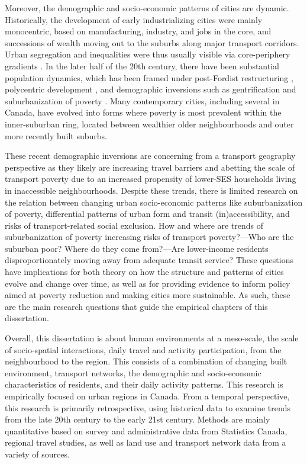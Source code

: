 Moreover, the demographic and socio-economic patterns of cities are dynamic. Historically, the development of early industrializing cities were mainly monocentric, based on manufacturing, industry, and jobs in the core, and successions of wealth moving out to the suburbs along major transport corridors. Urban segregation and inequalities were thus usually visible via core-periphery gradients \cite{burgess_growth_1925,alonso_location_1964,glaeser_sprawl_2004}. In the later half of the 20th century, there have been substantial population dynamics, which has been framed under post-Fordist restructuring \cite{walks_social_2001}, polycentric development \cite{anas_urban_1998}, and demographic inversions \cite{ehrenhalt_great_2012} such as gentrification \cite{vigdor_does_2002} and suburbanization of poverty \cite{ades_are_2012}. Many contemporary cities, including several in Canada, have evolved into forms where poverty is most prevalent within the inner-suburban ring, located between wealthier older neighbourhoods and outer more recently built suburbs.


These recent demographic inversions are concerning from a transport geography perspective as they likely are increasing travel barriers and abetting the scale of transport poverty due to an increased propensity of lower-SES households living in inaccessible neighbourhoods. Despite these trends, there is limited research on the relation between changing urban socio-economic patterns like suburbanization of poverty, differential patterns of urban form and transit (in)accessibility, and risks of transport-related social exclusion. How and where are trends of suburbanization of poverty increasing risks of transport poverty?---Who are the suburban poor? Where do they come from?---Are lower-income residents disproportionately moving away from adequate transit service? These questions have implications for both theory on how the structure and patterns of cities evolve and change over time, as well as for providing evidence to inform policy aimed at poverty reduction and making cities more sustainable. As such, these are the main research questions that guide the empirical chapters of this dissertation.


Overall, this dissertation is about human environments at a meso-scale, the scale of socio-spatial interactions, daily travel and activity participation, from the neighbourhood to the region. This consists of a combination of changing built environment, transport networks, the demographic and socio-economic characteristics of residents, and their daily activity patterns. This research is empirically focused on urban regions in Canada. From a temporal perspective, this research is primarily retrospective, using historical data to examine trends from the late 20th century to the early 21st century. Methods are mainly quantitative based on survey and administrative data from Statistics Canada, regional travel studies, as well as land use and transport network data from a variety of sources. 

